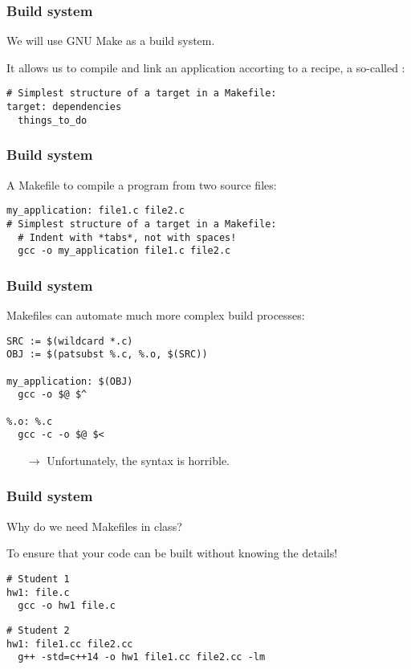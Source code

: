 \documentclass[12pt,t]{beamer}
\let\emph\relax %
\newcommand{\conclude}[1]{%
  \begin{itemize}
    \item[$\rightarrow$]#1
  \end{itemize}
}
\begin{document}
  \begin{frame}[fragile]
    \frametitle{Build system}

    We will use GNU Make as a build system.

    It allows us to compile and link an application accorting to a recipe, a so-called \emph{Makefile}:

    \begin{lstlisting}[frame=single]
# Simplest structure of a target in a Makefile:
target: dependencies
  things_to_do
    \end{lstlisting}
  \end{frame}

  \begin{frame}[fragile]
    \frametitle{Build system}

    A Makefile to compile a program from two source files:

    \begin{lstlisting}[frame=single]
my_application: file1.c file2.c
# Simplest structure of a target in a Makefile:
  # Indent with *tabs*, not with spaces!
  gcc -o my_application file1.c file2.c
    \end{lstlisting}
  \end{frame}

  \begin{frame}[fragile]
    \frametitle{Build system}

    Makefiles can automate much more complex build processes:

    \begin{lstlisting}[frame=single]
SRC := $(wildcard *.c)
OBJ := $(patsubst %.c, %.o, $(SRC))

my_application: $(OBJ)
  gcc -o $@ $^

%.o: %.c
  gcc -c -o $@ $<
    \end{lstlisting}

    \conclude{Unfortunately, the syntax is horrible.}
  \end{frame}

  \begin{frame}[fragile]
    \frametitle{Build system}

    Why do we need Makefiles in class?

    To ensure that your code can be built without knowing the details!

    \begin{lstlisting}[frame=single]
# Student 1
hw1: file.c
  gcc -o hw1 file.c
    \end{lstlisting}

    \begin{lstlisting}[frame=single]
# Student 2
hw1: file1.cc file2.cc
  g++ -std=c++14 -o hw1 file1.cc file2.cc -lm
    \end{lstlisting}
  \end{frame}
\end{document}

